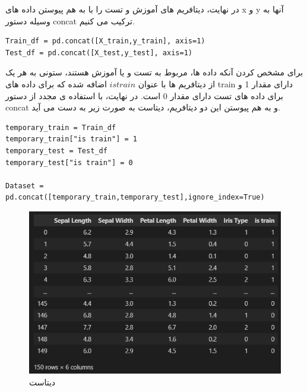 در نهایت، دیتافریم های آموزش و تست را با به هم پیوستن داده های x و y آنها به وسیله دستور concat ترکیب می کنیم. 
\begin{verbatim}
Train_df = pd.concat([X_train,y_train], axis=1)
Test_df = pd.concat([X_test,y_test], axis=1)
\end{verbatim}
برای مشخص کردن آنکه داده ها، مربوط به تست و یا آموزش هستند، ستونی به هر یک از دیتافریم ها با عنوان $is train$ اضافه شده که برای داده های train دارای مقدار 1 و برای داده های تست دارای مقدار 0 است.
در نهایت، با استفاده ی مجدد از دستور concat و به هم پیوستن این دو دیتافریم، دیتاست به صورت زیر به دست می آید.
\begin{verbatim}
temporary_train = Train_df
temporary_train["is train"] = 1
temporary_test = Test_df
temporary_test["is train"] = 0

Dataset = pd.concat([temporary_train,temporary_test],ignore_index=True)
\end{verbatim}
\begin{figure}[H]
	\centering
	\includegraphics[width=0.7\linewidth]{../img/8}
	\caption{دیتاست}
	\label{fig:8}
\end{figure}

